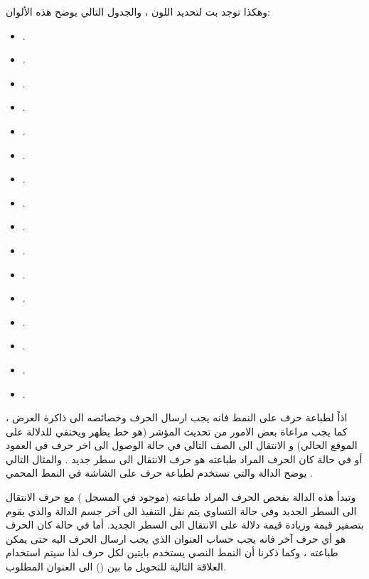\documentclass[document.tex]{subfiles}
\begin{document}
وهكذا توجد  بت لتحديد اللون ، والجدول التالي يوضح هذه الألوان:
\begin{english}
\begin{itemize}
\item {}.
\item {}.
\item {}.
\item {}.
\item {}.
\item {}.
\item {}.
\item {}.
\item {}.
\item {}.
\item {}.
\item {}.
\item {}.
\item {}.
\item {}.
\item {}.

\end{itemize}
\end{english}

اذاً لطباعة حرف على النمط  فانه يجب ارسال الحرف وخصائصه الى ذاكرة العرض ، كما يجب مراعاة بعض الامور من تحديث المؤشر  (هو خط   يظهر ويختفي للدلالة على الموقع الحالي) و الانتقال الى الصف التالي في حالة الوصول الى اخر حرف في العمود أو في حالة كان الحرف المراد طباعته هو حرف الانتقال الى سطر جديد  . والمثال التالي يوضح الدالة  والتي تستخدم لطباعة حرف على الشاشة في النمط المحمي .

\begin{english}
\lstset{numberstyle=\tiny,numbers=left,stepnumber=1,numbersep=5pt,tabsize=2,extendedchars=true,breaklines=true,frame=b,showspaces=false, showtabs=false,xleftmargin=10pt,framexleftmargin=10pt,framexrightmargin=5pt,framexbottommargin=4pt,showstringspaces=false,language=[x86masm]Assembler}


\end{english}

وتبدأ هذه الدالة بفحص الحرف المراد طباعته (موجود في المسجل ) مع حرف الانتقال الى السطر الجديد  وفي حالة التساوي يتم نقل التنفيذ الى آخر جسم الدالة والذي يقوم بتصفير قيمة  وزيادة قيمة  دلالة على الانتقال الى السطر الجديد. أما في حالة كان الحرف هو أي حرف آخر فانه يجب حساب العنوان الذي يجب ارسال الحرف اليه حتى يمكن طباعته ، وكما ذكرنا أن النمط النصي  يستخدم بايتين لكل حرف لذا سيتم استخدام العلاقة التالية للتحويل ما بين () الى العنوان المطلوب.
\end{document}
